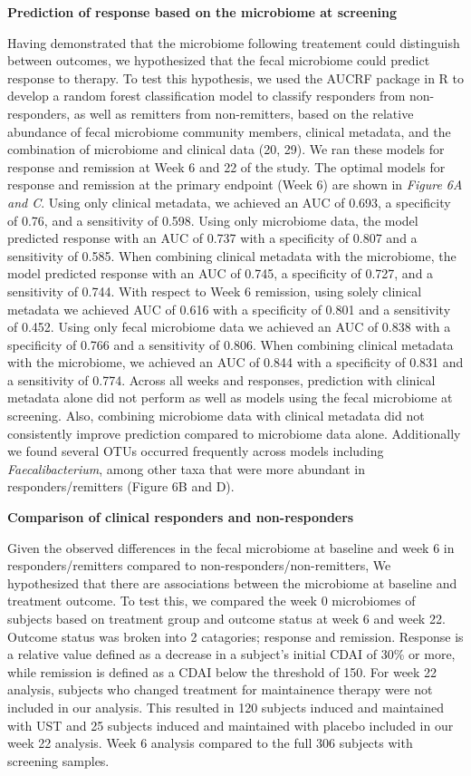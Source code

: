\documentclass[11pt,]{article}
\begin{document}
\textbf{Prediction of response based on the microbiome at screening}

Having demonstrated that the microbiome following treatement could
distinguish between outcomes, we hypothesized that the fecal microbiome
could predict response to therapy. To test this hypothesis, we used the
AUCRF package in R to develop a random forest classification model to
classify responders from non-responders, as well as remitters from
non-remitters, based on the relative abundance of fecal microbiome
community members, clinical metadata, and the combination of microbiome
and clinical data (20, 29). We ran these models for response and
remission at Week 6 and 22 of the study. The optimal models for response
and remission at the primary endpoint (Week 6) are shown in \emph{Figure
6A and C}. Using only clinical metadata, we achieved an AUC of 0.693, a
specificity of 0.76, and a sensitivity of 0.598. Using only microbiome
data, the model predicted response with an AUC of 0.737 with a
specificity of 0.807 and a sensitivity of 0.585. When combining clinical
metadata with the microbiome, the model predicted response with an AUC
of 0.745, a specificity of 0.727, and a sensitivity of 0.744. With
respect to Week 6 remission, using solely clinical metadata we achieved
AUC of 0.616 with a specificity of 0.801 and a sensitivity of 0.452.
Using only fecal microbiome data we achieved an AUC of 0.838 with a
specificity of 0.766 and a sensitivity of 0.806. When combining clinical
metadata with the microbiome, we achieved an AUC of 0.844 with a
specificity of 0.831 and a sensitivity of 0.774. Across all weeks and
responses, prediction with clinical metadata alone did not perform as
well as models using the fecal microbiome at screening. Also, combining
microbiome data with clinical metadata did not consistently improve
prediction compared to microbiome data alone. Additionally we found
several OTUs occurred frequently across models including
\emph{Faecalibacterium}, among other taxa that were more abundant in
responders/remitters (Figure 6B and D).

\textbf{Comparison of clinical responders and non-responders}

Given the observed differences in the fecal microbiome at baseline and
week 6 in responders/remitters compared to non-responders/non-remitters,
We hypothesized that there are associations between the microbiome at
baseline and treatment outcome. To test this, we compared the week 0
microbiomes of subjects based on treatment group and outcome status at
week 6 and week 22. Outcome status was broken into 2 catagories;
response and remission. Response is a relative value defined as a
decrease in a subject's initial CDAI of 30\% or more, while remission is
defined as a CDAI below the threshold of 150. For week 22 analysis,
subjects who changed treatment for maintainence therapy were not
included in our analysis. This resulted in 120 subjects induced and
maintained with UST and 25 subjects induced and maintained with placebo
included in our week 22 analysis. Week 6 analysis compared to the full
306 subjects with screening samples.
\end{document}
